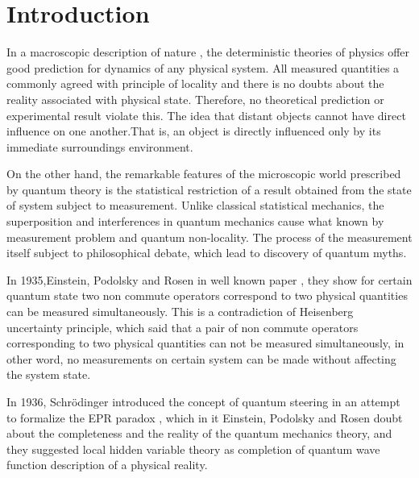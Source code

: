 \chapter{Introduction}


In a macroscopic description of nature
, the deterministic theories of physics offer good prediction for dynamics of any physical system. All measured quantities a commonly agreed with principle of locality and there is no doubts about the reality associated with physical state. Therefore, no theoretical prediction or experimental result violate this. The idea that distant objects cannot have direct influence on one another.That is, an object is directly influenced only by its immediate surroundings environment.

On the other hand, the remarkable features of the microscopic world prescribed by quantum theory is the statistical restriction of a result obtained from the state of system subject to measurement. Unlike classical statistical mechanics, the superposition and interferences in quantum mechanics cause what known by measurement problem and  quantum non-locality.
The process of the measurement itself subject to philosophical debate, which lead to discovery of quantum myths.

In 1935,Einstein, Podolsky and Rosen in well known paper \citep*{EPR}, they show for certain quantum state two non commute operators correspond to two physical quantities can be measured simultaneously.
This is a contradiction of Heisenberg uncertainty principle, which said that a pair of non commute operators corresponding to two physical quantities  can not be measured simultaneously, in other word, no measurements on certain system can be made without affecting the system state.


In 1936, Schrödinger introduced the concept of quantum steering in an attempt to formalize the EPR paradox \citep*{schrodinger1935discussion}, which in it Einstein, Podolsky and Rosen doubt about the completeness and the reality of the quantum mechanics theory, and they suggested local hidden variable theory as completion of quantum wave function description of a physical reality.
 
